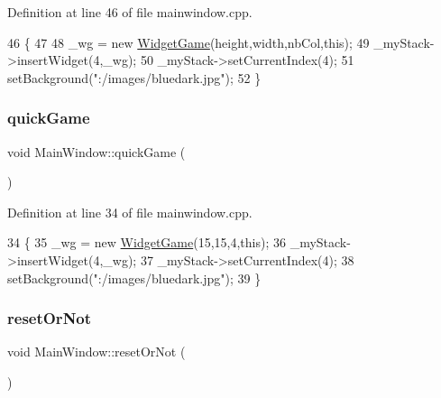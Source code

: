 Definition at line 46 of file mainwindow.\+cpp.


\begin{DoxyCode}
46                                                       \{
47 
48     \_wg = \textcolor{keyword}{new} \hyperlink{class_widget_game}{WidgetGame}(height,width,nbCol,\textcolor{keyword}{this});
49     \_myStack->insertWidget(4,\_wg);
50     \_myStack->setCurrentIndex(4);
51     setBackground(\textcolor{stringliteral}{":/images/bluedark.jpg"});
52 \}
\end{DoxyCode}
\hypertarget{class_main_window_ab1584e555ed5ad91453f18ea51d0351e}{}\label{class_main_window_ab1584e555ed5ad91453f18ea51d0351e} 
\subsubsection{\texorpdfstring{quick\+Game}{quickGame}}
{\footnotesize\ttfamily void Main\+Window\+::quick\+Game (\begin{DoxyParamCaption}{ }\end{DoxyParamCaption})\hspace{0.3cm}{\ttfamily [slot]}}



Definition at line 34 of file mainwindow.\+cpp.


\begin{DoxyCode}
34                           \{
35     \_wg = \textcolor{keyword}{new} \hyperlink{class_widget_game}{WidgetGame}(15,15,4,\textcolor{keyword}{this});
36     \_myStack->insertWidget(4,\_wg);
37     \_myStack->setCurrentIndex(4);
38     setBackground(\textcolor{stringliteral}{":/images/bluedark.jpg"});
39 \}
\end{DoxyCode}
\hypertarget{class_main_window_a114eef08f156b273538f61c85a3db72f}{}\label{class_main_window_a114eef08f156b273538f61c85a3db72f} 
\subsubsection{\texorpdfstring{reset\+Or\+Not}{resetOrNot}}
{\footnotesize\ttfamily void Main\+Window\+::reset\+Or\+Not (\begin{DoxyParamCaption}{ }\end{DoxyParamCaption})\hspace{0.3cm}{\ttfamily [slot]}}



